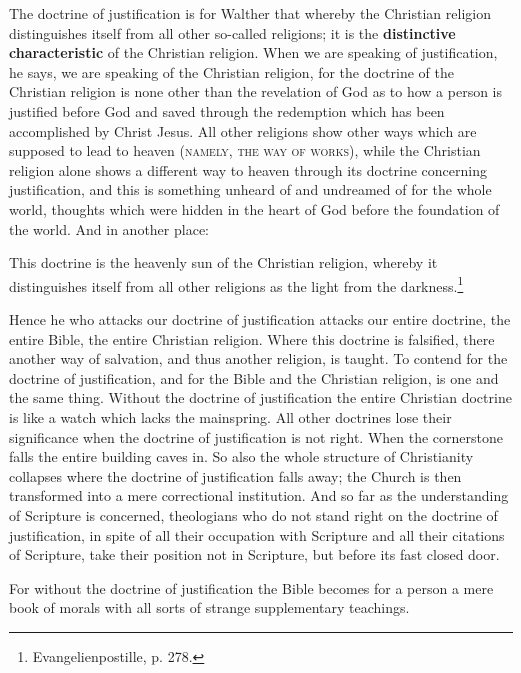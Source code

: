                 The doctrine of justification is for Walther that whereby the Christian religion distinguishes itself from all other so-called religions; it is the \textbf{distinctive characteristic} of the Christian religion.  When we are speaking of justification, he says, we are speaking of the Christian religion, for the doctrine of the Christian religion is none other than the revelation of God as to how a person is justified before God and saved through the redemption which has been accomplished by Christ Jesus.  All other religions show other ways which are supposed to lead to heaven {\scriptsize\textsc{(namely, the way of works)}}, while the Christian religion alone shows a different way to heaven through its doctrine concerning justification, and this is something unheard of and undreamed of for the whole world, thoughts which were hidden in the heart of God before the foundation of the world.  And in another place: \begin{displayquote}{\footnotesize This doctrine is the heavenly sun of the Christian religion, whereby it distinguishes itself from all other religions as the light from the darkness.}\footnote{Evangelienpostille, p. 278.}\end{displayquote}  Hence he who attacks our doctrine of justification attacks our entire doctrine, the entire Bible, the entire Christian religion.  Where this doctrine is falsified, there another way of salvation, and thus another religion, is taught.  To contend for the doctrine of justification, and for the Bible and the Christian religion, is one and the same thing.  Without the doctrine of justification the entire Christian doctrine is like a watch which lacks the mainspring.  All other doctrines lose their significance when the doctrine of justification is not right.  When the cornerstone falls the entire building caves in.  So also the whole structure of Christianity collapses where the doctrine of justification falls away; the Church is then transformed into a mere correctional institution.  And so far as the understanding of Scripture is concerned, theologians who do not stand right on the doctrine of justification, in spite of all their occupation with Scripture and all their citations of Scripture, take their position not in Scripture, but before its fast closed door.  \begin{displayquote}{\footnotesize For without the doctrine of justification the Bible becomes for a person a mere book of morals with all sorts of strange supplementary teachings.} \end{displayquote}

